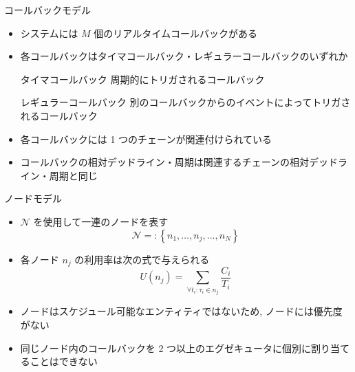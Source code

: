 

\begin{frame}{コールバックモデル}
    \begin{itemize}
        \item システムには $M$ 個のリアルタイムコールバックがある
        \item 各コールバックはタイマコールバック・レギュラーコールバックのいずれか
              \begin{block}{タイマコールバック}
                  周期的にトリガされるコールバック
              \end{block}
              \begin{block}{レギュラーコールバック}
                  別のコールバックからのイベントによってトリガされるコールバック
              \end{block}
              \vspace{5mm}
        \item 各コールバックには 1 つのチェーンが関連付けられている
        \item コールバックの相対デッドライン・周期は関連するチェーンの相対デッドライン・周期と同じ
    \end{itemize}
\end{frame}

\begin{frame}{ノードモデル}
    \begin{itemize}
        \item  $\mathcal{N}$ を使用して一連のノードを表す
              \vspace{-2mm}
              \begin{equation*}
                  \mathcal{N}=:\left\{n_{1}, \ldots, n_{j}, \ldots, n_{N}\right\}
              \end{equation*}
        \item 各ノード $n_{j}$ の利用率は次の式で与えられる
              \vspace{-2mm}
              \begin{equation*}
                  U\left(n_{j}\right)=\sum_{\forall t_{i}: \tau_{i} \in n_{j}} \frac{C_{i}}{T_{i}}
              \end{equation*}
        \item ノードはスケジュール可能なエンティティではないため, ノードには優先度がない
        \item 同じノード内のコールバックを 2 つ以上のエグゼキュータに個別に割り当てることはできない
    \end{itemize}
\end{frame}

